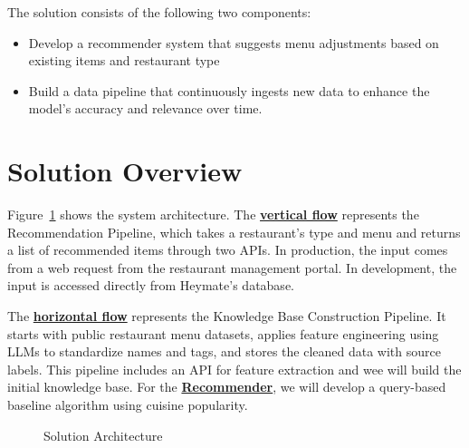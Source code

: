 \documentclass[
  11pt,
  a4paper,
  DIV=11,
  numbers=noendperiod]{scrartcl}
\providecommand{\tightlist}{%
  \setlength{\itemsep}{0pt}\setlength{\parskip}{0pt}}\usepackage{longtable,booktabs,array}
\begin{document}
The solution consists of the following two components:

\begin{itemize}
\tightlist
\item
  Develop a recommender system that suggests menu adjustments based on
  existing items and restaurant type\\
\item
  Build a data pipeline that continuously ingests new data to enhance
  the model's accuracy and relevance over time.
\end{itemize}

\section{Solution Overview}\label{solution-overview}

Figure~\ref{fig-solution-architecture} shows the system architecture.
The \hyperref[fig-solution-architecture]{\textbf{vertical flow}}
represents the Recommendation Pipeline, which takes a restaurant's type
and menu and returns a list of recommended items through two APIs. In
production, the input comes from a web request from the restaurant
management portal. In development, the input is accessed directly from
Heymate's database.

The \hyperref[fig-solution-architecture]{\textbf{horizontal flow}}
represents the Knowledge Base Construction Pipeline. It starts with
public restaurant menu datasets, applies feature engineering using LLMs
to standardize names and tags, and stores the cleaned data with source
labels. This pipeline includes an API for feature extraction and wee
will build the initial knowledge base. For the
\hyperref[fig-solution-architecture]{\textbf{Recommender}}, we will
develop a query-based baseline algorithm using cuisine popularity.

\begin{figure}

\caption{\label{fig-solution-architecture}Solution Architecture}


\end{figure}%
\end{document}

